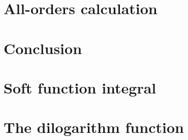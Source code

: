 \documentclass[12pt,twoside]{reedthesis}
\begin{document}
	\graphicspath{{factorization/}}
	


\chapter{All-orders calculation}\label{chap:all orders}
	
	
	

\chapter*{Conclusion}
\setcounter{chapter}{5}
\setcounter{section}{0}
	
	


\appendix
\chapter{Soft function integral}\label{app:soft function integral}

	\graphicspath{{appendix_soft_function/}}
	

\chapter{The dilogarithm function}\label{app:dilogarithm}

  



  \backmatter %



%  
 

\end{document}
